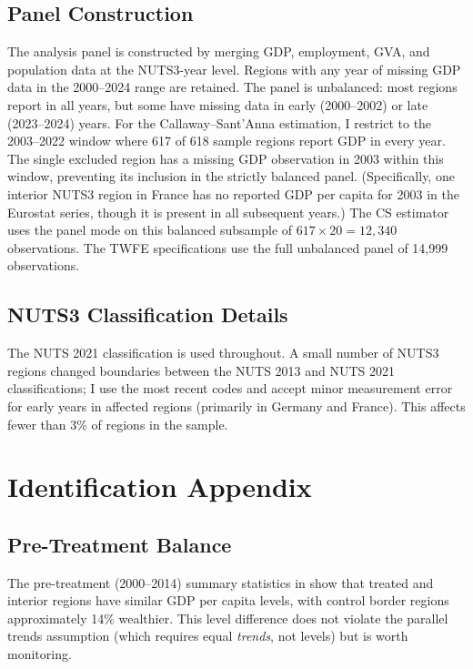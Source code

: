 \documentclass[12pt]{article}
\begin{document}
\subsection{Panel Construction}

The analysis panel is constructed by merging GDP, employment, GVA, and population data at the NUTS3-year level. Regions with any year of missing GDP data in the 2000--2024 range are retained. The panel is unbalanced: most regions report in all years, but some have missing data in early (2000--2002) or late (2023--2024) years. For the Callaway--Sant'Anna estimation, I restrict to the 2003--2022 window where 617 of 618 sample regions report GDP in every year. The single excluded region has a missing GDP observation in 2003 within this window, preventing its inclusion in the strictly balanced panel. (Specifically, one interior NUTS3 region in France has no reported GDP per capita for 2003 in the Eurostat series, though it is present in all subsequent years.) The CS estimator uses the panel mode on this balanced subsample of $617 \times 20 = 12{,}340$ observations. The TWFE specifications use the full unbalanced panel of 14,999 observations.

\subsection{NUTS3 Classification Details}

The NUTS 2021 classification is used throughout. A small number of NUTS3 regions changed boundaries between the NUTS 2013 and NUTS 2021 classifications; I use the most recent codes and accept minor measurement error for early years in affected regions (primarily in Germany and France). This affects fewer than 3\% of regions in the sample.


\section{Identification Appendix}
\label{app:ident}

\subsection{Pre-Treatment Balance}

The pre-treatment (2000--2014) summary statistics in  show that treated and interior regions have similar GDP per capita levels, with control border regions approximately 14\% wealthier. This level difference does not violate the parallel trends assumption (which requires equal \textit{trends}, not levels) but is worth monitoring.
\end{document}
